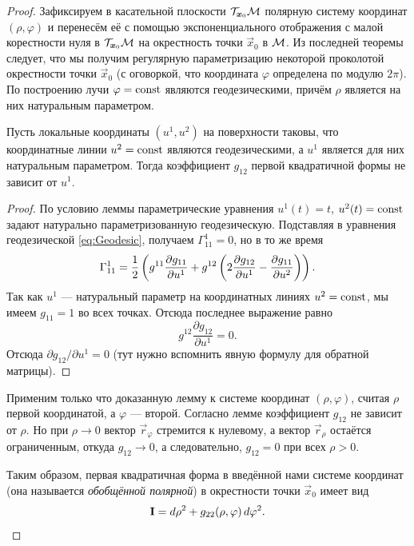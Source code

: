 \begin{proof}
	Зафиксируем в касательной плоскости $\mathcal{T}_{\boldsymbol{x}_0}\mathcal{M}$ полярную систему координат $(\rho, \varphi)$ и перенесём её с помощью экспоненциального отображения с малой корестности нуля в $\mathcal{T}_{\boldsymbol{x}_0}\mathcal{M}$ на окрестность точки $\vec{x}_0$ в $\mathcal{M}$. Из последней теоремы следует, что мы получим регулярную параметризацию некоторой проколотой окрестности точки $\vec{x}_0$ (с оговоркой, что координата $\varphi$ определена по модулю $2\pi$). По построению лучи $\varphi = \mathrm{const}$ являются геодезическими, причём $\rho$ является на них натуральным параметром.

	\begin{lemma} \label{lemma:g12}
		Пусть локальные координаты $(u^1, u^2)$ на поверхности таковы, что координатные линии $u^2 = \mathrm{const}$ являются геодезическими, а $u^1$ является для них натуральным параметром. Тогда коэффициент $g_{12}$ первой квадратичной формы не зависит от $u^1$.
	\end{lemma}

	\begin{proof}
		По условию леммы параметрические уравнения $u^1(t) = t$, $u^2(t) \hm= \const$ задают натурально параметризованную геодезическую. Подставляя в уравнения геодезической \eqref{eq:Geodesic}, получаем $\Gamma_{11}^1 = 0$, но в то же время
		\[
			\Gamma_{11}^1 = \frac{1}{2}\left(g^{11}\frac{\partial g_{11}}{\partial u^1} + g^{12}\left(2\frac{\partial g_{12}}{\partial u^1} - \frac{\partial g_{11}}{\partial u^2}\right)\right).
		\]
		Так как $u^1$ --- натуральный параметр на координатных линиях $u^2 = \mathrm{const}$, мы имеем $g_{11} = 1$ во всех точках. Отсюда последнее выражение равно
		\[
			g^{12}\frac{\partial g_{12}}{\partial u^1} = 0.
		\]
		Отсюда $\partial g_{12} / \partial u^1 = 0$ (тут нужно вспомнить явную формулу для обратной матрицы).
	\end{proof}

	Применим только что доказанную лемму к системе координат $(\rho, \varphi)$, считая $\rho$ первой координатой, а $\varphi$ --- второй. Согласно лемме коэффициент $g_{12}$ не зависит от $\rho$. Но при $\rho \to 0$ вектор $\vec{r}_\varphi$ стремится к нулевому, а вектор $\vec{r}_\rho$ остаётся ограниченным, откуда $g_{12} \to 0$, а следовательно, $g_{12} = 0$ при всех $\rho > 0$.

	Таким образом, первая квадратичная форма в введённой нами системе координат (она называется \textit{обобщённой полярной}) в окрестности точки $\vec{x}_0$ имеет вид
	\[
		\boldsymbol{\operatorname{I}} = d\rho^2 + g_{22}(\rho, \varphi)\,d\varphi^2.
	\]


\end{proof}
